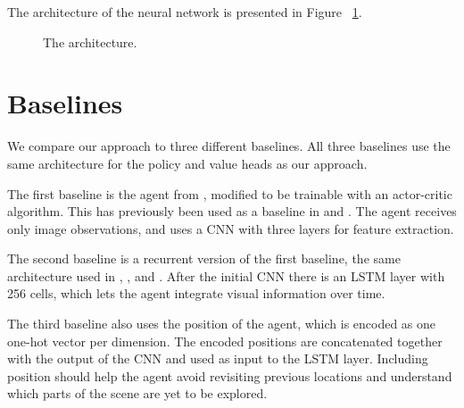 The architecture of the neural network is presented in Figure ~\ref{fig:approach}.


\begin{figure}
    \centering
    
    \label{fig:approach}
    \caption[Approach architecture]{The architecture.}
\end{figure}



\section{Baselines}
\label{sec:baseline}


We compare our approach to three different baselines.
All three baselines use the same architecture for the policy and value heads as our approach.

The first baseline is the agent from \cite{mnih_human_2015}, modified to be trainable with an actor-critic algorithm.
This has previously been used as a baseline in \cite{mirowski_navigate_2017} and \cite{cobbe_procgen_2020}.
The agent receives only image observations, and uses a CNN with three layers for feature extraction.

The second baseline is a recurrent version of the first baseline, the same architecture used in \cite{mnih_asynchronous_2016}, \cite{mirowski_navigate_2017}, and \cite{gupta_cognitive_2019}.
After the initial CNN there is an LSTM layer with 256 cells,
which lets the agent integrate visual information over time.

The third baseline also uses the position of the agent, which is encoded as one one-hot vector per dimension. 
The encoded positions are concatenated together with the output of the CNN and used as input to the LSTM layer.
Including position should help the agent avoid revisiting previous locations and understand which parts of the scene are yet to be explored. 

